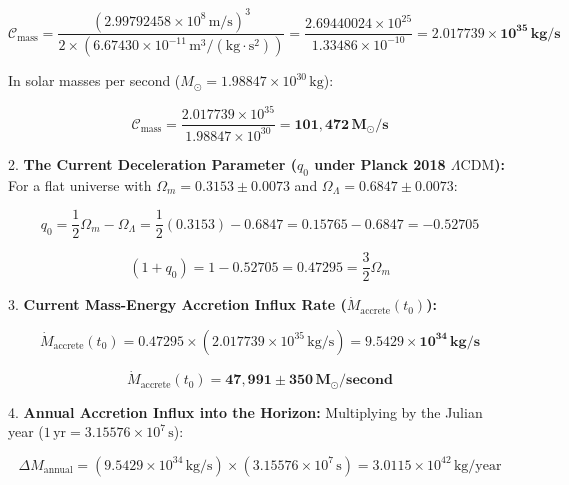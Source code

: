\documentclass[11pt,a4paper]{article}
\theoremstyle{definition}
\theoremstyle{remark}
\begin{document}
\begin{equation}
\mathcal{C}_{\text{mass}} = \frac{(2.99792458 \times 10^8 \, \mathrm{m/s})^3}{2 \times (6.67430 \times 10^{-11} \, \mathrm{m^3/(kg \cdot s^2)})} = \frac{2.69440024 \times 10^{25}}{1.33486 \times 10^{-10}} = \mathbf{2.017739 \times 10^{35} \, kg/s}
\end{equation}

   In solar masses per second ($M_\odot = 1.98847 \times 10^{30} \, \mathrm{kg}$):
   
\begin{equation}
\mathcal{C}_{\text{mass}} = \frac{2.017739 \times 10^{35}}{1.98847 \times 10^{30}} = \mathbf{101,472 \, M_\odot/s}
\end{equation}


2. \textbf{The Current Deceleration Parameter ($q_0$ under Planck 2018 $\Lambda\text{CDM}$):}  
   For a flat universe with $\Omega_m = 0.3153 \pm 0.0073$ and $\Omega_\Lambda = 0.6847 \pm 0.0073$:
   
\begin{equation}
q_0 = \frac{1}{2}\Omega_m - \Omega_\Lambda = \frac{1}{2}(0.3153) - 0.6847 = 0.15765 - 0.6847 = \mathbf{-0.52705}
\end{equation}

   
\begin{equation}
(1 + q_0) = 1 - 0.52705 = \mathbf{0.47295} = \frac{3}{2}\Omega_m
\end{equation}


3. \textbf{Current Mass-Energy Accretion Influx Rate ($\dot{M}_{\text{accrete}}(t_0)$):}  
   
\begin{equation}
\dot{M}_{\text{accrete}}(t_0) = 0.47295 \times (2.017739 \times 10^{35} \, \mathrm{kg/s}) = \mathbf{9.5429 \times 10^{34} \, kg/s}
\end{equation}

   
\begin{equation}
\boxed{\dot{M}_{\text{accrete}}(t_0) = \mathbf{47,991 \pm 350 \, M_\odot / \text{second}}}
\end{equation}


4. \textbf{Annual Accretion Influx into the Horizon:}  
   Multiplying by the Julian year ($1 \, \text{yr} = 3.15576 \times 10^7 \, \mathrm{s}$):
   
\begin{equation}
\Delta M_{\text{annual}} = (9.5429 \times 10^{34} \, \mathrm{kg/s}) \times (3.15576 \times 10^7 \, \mathrm{s}) = 3.0115 \times 10^{42} \, \mathrm{kg/year}
\end{equation}
\end{document}
